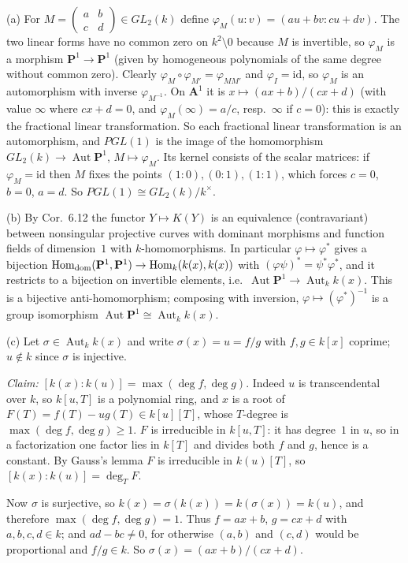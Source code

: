 \documentclass[11pt]{article}
\begin{document}
(a) For $M=\begin{pmatrix}a&b\\c&d\end{pmatrix}\in GL_2(k)$ define $\varphi_M(u:v)=(au+bv:cu+dv)$. The two linear forms have no common zero on $k^2\setminus0$ because $M$ is invertible, so $\varphi_M$ is a morphism $\mathbf P^1\to\mathbf P^1$ (given by homogeneous polynomials of the same degree without common zero). Clearly $\varphi_M\circ\varphi_{M'}=\varphi_{MM'}$ and $\varphi_I=\mathrm{id}$, so $\varphi_M$ is an automorphism with inverse $\varphi_{M^{-1}}$. On $\mathbf A^1$ it is $x\mapsto(ax+b)/(cx+d)$ (with value $\infty$ where $cx+d=0$, and $\varphi_M(\infty)=a/c$, resp.\ $\infty$ if $c=0$): this is exactly the fractional linear transformation. So each fractional linear transformation is an automorphism, and $PGL(1)$ is the image of the homomorphism $GL_2(k)\to\operatorname{Aut}\mathbf P^1$, $M\mapsto\varphi_M$. Its kernel consists of the scalar matrices: if $\varphi_M=\mathrm{id}$ then $M$ fixes the points $(1:0),(0:1),(1:1)$, which forces $c=0$, $b=0$, $a=d$. So $PGL(1)\cong GL_2(k)/k^\times$.

(b) By Cor.~6.12 the functor $Y\mapsto K(Y)$ is an equivalence (contravariant) between nonsingular projective curves with dominant morphisms and function fields of dimension~$1$ with $k$-homomorphisms. In particular $\varphi\mapsto\varphi^*$ gives a bijection $\operatorname{Hom}_{\rm dom}(\mathbf P^1,\mathbf P^1)\to\operatorname{Hom}_k(k(x),k(x))$ with $(\varphi\psi)^*=\psi^*\varphi^*$, and it restricts to a bijection on invertible elements, i.e.\ $\operatorname{Aut}\mathbf P^1\to\operatorname{Aut}_kk(x)$. This is a bijective anti-homomorphism; composing with inversion, $\varphi\mapsto(\varphi^*)^{-1}$ is a group isomorphism $\operatorname{Aut}\mathbf P^1\cong\operatorname{Aut}_kk(x)$.

(c) Let $\sigma\in\operatorname{Aut}_kk(x)$ and write $\sigma(x)=u=f/g$ with $f,g\in k[x]$ coprime; $u\notin k$ since $\sigma$ is injective.

\emph{Claim:} $[k(x):k(u)]=\max(\deg f,\deg g)$. Indeed $u$ is transcendental over $k$, so $k[u,T]$ is a polynomial ring, and $x$ is a root of $F(T)=f(T)-ug(T)\in k[u][T]$, whose $T$-degree is $\max(\deg f,\deg g)\ge1$. $F$ is irreducible in $k[u,T]$: it has degree~$1$ in $u$, so in a factorization one factor lies in $k[T]$ and divides both $f$ and $g$, hence is a constant. By Gauss's lemma $F$ is irreducible in $k(u)[T]$, so $[k(x):k(u)]=\deg_TF$.

Now $\sigma$ is surjective, so $k(x)=\sigma(k(x))=k(\sigma(x))=k(u)$, and therefore $\max(\deg f,\deg g)=1$. Thus $f=ax+b$, $g=cx+d$ with $a,b,c,d\in k$; and $ad-bc\ne0$, for otherwise $(a,b)$ and $(c,d)$ would be proportional and $f/g\in k$. So $\sigma(x)=(ax+b)/(cx+d)$.
\end{document}
